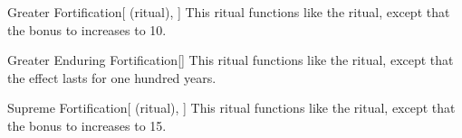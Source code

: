 \lowercase{\hypertarget{spell:Greater Fortification}{}}\label{spell:Greater Fortification}
\begin{attuneability}[Rank 4]{\hypertarget{spell:Greater Fortification}{Greater Fortification}}[ (ritual), ]
This ritual functions like the  ritual, except that the bonus to  increases to 10.
\end{attuneability}
\vspace{0.25em}



\lowercase{\hypertarget{spell:Greater Enduring Fortification}{}}\label{spell:Greater Enduring Fortification}
\begin{apability}[Rank 5]{\hypertarget{spell:Greater Enduring Fortification}{Greater Enduring Fortification}}[]
This ritual functions like the  ritual, except that the effect lasts for one hundred years.
\end{apability}
\vspace{0.25em}



\lowercase{\hypertarget{spell:Supreme Fortification}{}}\label{spell:Supreme Fortification}
\begin{attuneability}[Rank 7]{\hypertarget{spell:Supreme Fortification}{Supreme Fortification}}[ (ritual), ]
This ritual functions like the  ritual, except that the bonus to  increases to 15.
\end{attuneability}
\vspace{0.25em}


